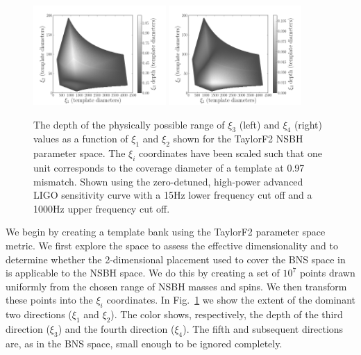 \begin{figure}
    \centering
    \begin{minipage}[l]{\columnwidth}
    \centering
\includegraphics[width=0.45\textwidth]
{papers/nsbh_effectualness/figure1A.png}
\includegraphics[width=0.45\textwidth]
{papers/nsbh_effectualness/figure1B.png}
\caption{\label{fig:bankF2depths}
The depth of the physically possible range of $\xi_3$ (left) and $\xi_4$ (right)
values as a function of
$\xi_1$ and $\xi_2$ shown for the TaylorF2 \ac{NSBH} parameter space.
The $\xi_i$ coordinates have been scaled
such that one unit corresponds to the coverage diameter of a template
at 0.97 mismatch. Shown using the zero-detuned, high-power advanced LIGO
sensitivity curve with a 15Hz lower frequency cut off
and a 1000Hz upper frequency cut off.}
\end{minipage}
\end{figure}

We begin by creating a template bank using the TaylorF2 parameter space metric.
We first explore the space to assess the effective dimensionality and to
determine whether the 2-dimensional placement used to cover the \ac{BNS}
space in~\cite{Brown:2012qf} is applicable to the \ac{NSBH}
space. We do this by creating a set of $10^7$ points drawn uniformly from the
chosen range of \ac{NSBH} masses and spins. We then transform these points
into the $\xi_i$ coordinates. In Fig.~\ref{fig:bankF2depths} we show the
extent of the dominant two directions ($\xi_1$ and $\xi_2$). The color shows,
respectively, the depth of the third direction ($\xi_3$) and the fourth
direction ($\xi_4$). The fifth and subsequent directions are, as in the \ac{BNS}
space, small enough to be ignored completely.


